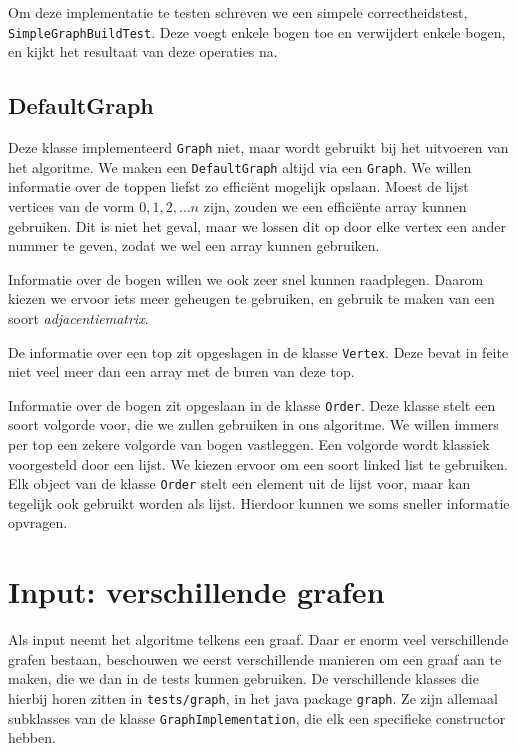 \documentclass{article}
\begin{document}
Om deze implementatie te testen schreven we een simpele correctheidstest,
\verb#SimpleGraphBuildTest#. Deze voegt enkele bogen toe en verwijdert enkele
bogen, en kijkt het resultaat van deze operaties na.

\subsection{DefaultGraph}
Deze klasse implementeerd \verb#Graph# niet, maar wordt gebruikt bij het
uitvoeren van het algoritme. We maken een \verb#DefaultGraph# altijd via een
\verb#Graph#. We willen informatie over de toppen liefst zo effici\"ent mogelijk
opslaan. Moest de lijst vertices van de vorm $0, 1, 2, \dots n$ zijn, zouden we
een effici\"ente array kunnen gebruiken. Dit is niet het geval, maar we lossen
dit op door elke vertex een ander nummer te geven, zodat we wel een array kunnen
gebruiken.
\newline

Informatie over de bogen willen we ook zeer snel kunnen raadplegen. Daarom
kiezen we ervoor iets meer geheugen te gebruiken, en gebruik te maken van een
soort \emph{adjacentiematrix}.
\newline

De informatie over een top zit opgeslagen in de klasse \verb#Vertex#. Deze bevat
in feite niet veel meer dan een array met de buren van deze top.
\newline

Informatie over de bogen zit opgeslaan in de klasse \verb#Order#. Deze klasse
stelt een soort volgorde voor, die we zullen gebruiken in ons algoritme. We
willen immers per top een zekere volgorde van bogen vastleggen. Een volgorde
wordt klassiek voorgesteld door een lijst. We kiezen ervoor om een soort linked
list te gebruiken. Elk object van de klasse \verb#Order# stelt een element uit
de lijst voor, maar kan tegelijk ook gebruikt worden als lijst. Hierdoor kunnen
we soms sneller informatie opvragen.

\section{Input: verschillende grafen}
Als input neemt het algoritme telkens een graaf. Daar er enorm veel
verschillende grafen bestaan, beschouwen we eerst verschillende manieren om een
graaf aan te maken, die we dan in de tests kunnen gebruiken. De verschillende
klasses die hierbij horen zitten in \verb#tests/graph#, in het java package
\verb#graph#. Ze zijn allemaal subklasses van de klasse
\verb#GraphImplementation#, die elk een specifieke constructor hebben.
\end{document}
